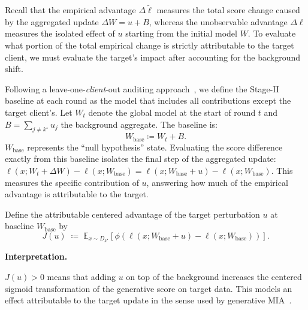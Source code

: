 \documentclass[bdcc,article,submit,pdftex]{Definitions/mdpi}
\newcommand{\E}{\mathbb{E}}
\newcommand{\tindex}{k^\star}
\newcommand{\utarget}{u}
\renewcommand{\paragraph}[1]{\medskip\noindent\textbf{#1}\par\nobreak}
\begin{document}
Recall that the empirical advantage $\Delta\tilde\ell$ measures the total score change caused by the aggregated update $\Delta W = \utarget + B$, whereas the unobservable advantage $\Delta\ell$ measures the isolated effect of $\utarget$ starting from the initial model $W$.
To evaluate what portion of the total empirical change is strictly attributable to the target client, we must evaluate the target's impact after accounting for the background shift.

\begin{Definition}
\label{def:Wbase}
Following a leave-one-\emph{client}-out auditing approach~\cite{carlini2022membership}, we define the Stage-II baseline at each round as the model that includes all contributions except the target client's. Let $W_t$ denote the global model at the start of round $t$ and $B = \sum_{j \neq \tindex} u_j$ the background aggregate. The baseline is:
\begin{equation}
\label{eq:Wbase}
W_{\mathrm{base}} \coloneqq W_t + B.
\end{equation}
$W_{\mathrm{base}}$ represents the ``null hypothesis'' state. Evaluating the score difference exactly from this baseline isolates the final step of the aggregated update:
$ \ell(x; W_t + \Delta W) - \ell(x; W_{\mathrm{base}}) = \ell(x; W_{\mathrm{base}} + \utarget) - \ell(x; W_{\mathrm{base}}). $
This measures the specific contribution of $\utarget$, answering how much of the empirical advantage is attributable to the target.
\end{Definition}

\begin{Definition}
\label{def:J}
Define the attributable centered advantage of the target perturbation $\utarget$ at baseline $W_{\mathrm{base}}$ by
\begin{equation}
\label{eq:J}
J(\utarget)
\;\coloneqq\;
\E_{x\sim D_{\tindex}}
\left[
\phi\!\left(\ell(x;W_{\mathrm{base}}+\utarget)-\ell(x;W_{\mathrm{base}})\right)
\right].
\end{equation}
\end{Definition}

\paragraph{Interpretation.}
$J(\utarget)>0$ means that adding $\utarget$ on top of the background increases the centered sigmoid transformation of the generative score on target data.
This models an effect attributable to the target update in the sense used by generative MIA~\cite{Galende2025Membership}.
\end{document}
